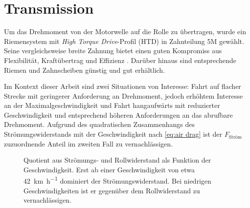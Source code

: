 	\section{Transmission}\label{sec:transmission}
		Um das Drehmoment von der Motorwelle auf die Rolle zu übertragen, wurde ein Riemensystem mit \textit{High Torque Drive}-Profil (HTD) in Zahnteilung 5M gewählt. 
		Seine vergleichsweise breite Zahnung bietet einen guten Kompromiss aus Flexibilität, Kraftübertrag und Effizienz \cite{gates.catalogue.2021}.
		Darüber hinaus sind entsprechende Riemen und Zahnscheiben günstig und gut erhältlich.\par\medskip
		Im Kontext dieser Arbeit sind zwei Situationen von Interesse: Fahrt auf flacher Strecke mit geringerer Anforderung an Drehmoment, jedoch erhöhtem Interesse an der Maximalgeschwindigkeit und Fahrt hangaufwärts mit reduzierter Geschwindigkeit und entsprechend höheren Anforderungen an das abrufbare Drehmoment.
		Aufgrund des quadratischen Zusammenhangs des Strömungswiderstands mit der Geschwindigkeit nach \cref{eq:air drag} ist der \(F_\text{Ström}\) zuzuordnende Anteil im zweiten Fall zu vernachlässigen.
		\begin{figure}[h]
			\centering
			
			\caption[Quotient aus Strömungs- und Rollwiderstand als Funktion der Geschwindigkeit]{Quotient aus Strömungs- und Rollwiderstand als Funktion der Geschwindigkeit. Erst ab einer Geschwindigkeit von etwa \qty{42}{\kilo\metre\per\hour} dominiert der Strömungswiderstand. Bei niedrigen Geschwindigkeiten ist er gegenüber dem Rollwiderstand zu vernachlässigen.}%
			\label{fig:Froll vs Fdrag}
		\end{figure}

